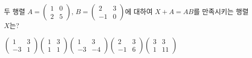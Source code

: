 두 행렬 $A=\begin{pmatrix} 1 & 0 \\ 2 & 5 \end{pmatrix}$, $B=\begin{pmatrix} 2 & 3 \\ -1 & 0 \end{pmatrix}$에 대하여 $X+A=AB$를 만족시키는 행렬 $X$는?
\begin{choicesii}{$\begin{pmatrix} 1 & 3 \\ -3 & 1 \end{pmatrix}$}{$\begin{pmatrix} 1 & 3 \\ 1 & 1 \end{pmatrix}$}{$\begin{pmatrix} 1 & 3 \\ -3 & -4 \end{pmatrix}$}{$\begin{pmatrix} 2 & 3 \\ -1 & 6 \end{pmatrix}$}{$\begin{pmatrix} 3 & 3 \\ 1 & 11 \end{pmatrix}$}\end{choicesii}
